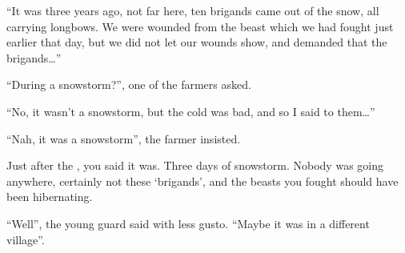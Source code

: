 \begin{multicols}{2}
\begin{exampletext}
  ``It was three years ago, not far here, ten brigands came out of the snow, all carrying longbows.
  We were wounded from the beast which we had fought just earlier that day, but we did not let our wounds show, and demanded that the brigands\ldots''

  ``During a snowstorm?'', one of the farmers asked.

  ``No, it wasn't a snowstorm, but the cold was bad, and so I said to them\ldots''

  ``Nah, it was a snowstorm'', the farmer insisted.

  Just after the \iftoggle{aif}{eclipse of \gls{ainumar}}{blue moon}, you said it was.
  Three days of snowstorm.
  Nobody was going anywhere, certainly not these `brigands', and the beasts you fought should have been hibernating.

  ``Well'', the young guard said with less gusto.
  ``Maybe it was in a different village''.

\end{exampletext}

\end{multicols}

